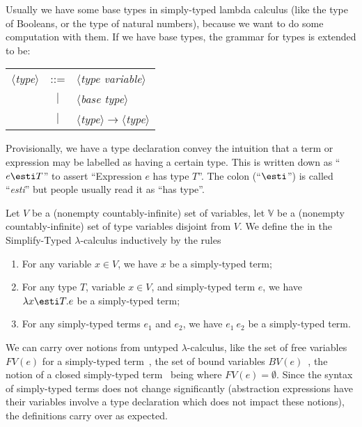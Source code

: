\begin{node}[Syntax]
\begin{definition}
\begin{node}\label{stlc-0005}%
Usually we have some base types in simply-typed lambda calculus (like
the type of Booleans, or the type of natural numbers), because we want
to do some computation with them. If we have base types, the grammar for
types is extended to be:
\begin{center}
\begin{tabular}{rcl}
$\langle$\textit{type}$\rangle$ & ::= & $\langle$\textit{type variable}$\rangle$\\
& $|$ & $\langle$\textit{base type}$\rangle$\\
& $|$ & $\langle$\textit{type}$\rangle\to\langle$\textit{type}$\rangle$
\end{tabular}
\end{center}
\end{node}
\end{definition}

\begin{node}\label{stlc-0008}%
Provisionally, we have a type declaration convey the intuition that a
term or expression may be labelled as having a certain type. This is
written down as ``$e\esti T$'' to assert ``Expression $e$ has type
$T$''. The colon (``$\esti$'') is called ``\textit{esti}'' but people
usually read it as ``has type''.
\end{node}

\begin{definition}\label{stlc-0006}%
Let $V$ be a (nonempty countably-infinite) set of variables, let $\mathbb{V}$ be a (nonempty countably-infinite)
set of type variables disjoint from $V$. We define the
 in the Simplify-Typed $\lambda$-calculus inductively by
the rules
\begin{enumerate}
\item For any variable $x\in V$, we have $x$ be a simply-typed term;
\item For any type $T$, variable $x\in V$, and simply-typed term $e$, we
  have $\lambda x\esti T.e$ be a simply-typed term;
\item For any simply-typed terms $e_{1}$ and $e_{2}$, we have
  $e_{1}~e_{2}$ be a simply-typed term.
\end{enumerate}
\end{definition}

\begin{node}\label{stlc-000M}%
We can carry over notions from untyped $\lambda$-calculus, like the set
of free variables $FV(e)$ for a simply-typed
term~, the set of bound variables
$BV(e)$~, the notion of a closed simply-typed
term~ being where $FV(e)=\emptyset$.  Since
the syntax of simply-typed terms does not change significantly
(abstraction expressions have their variables involve a type declaration
which does not impact these notions), the definitions carry over as
expected.
\end{node}


\end{node}
